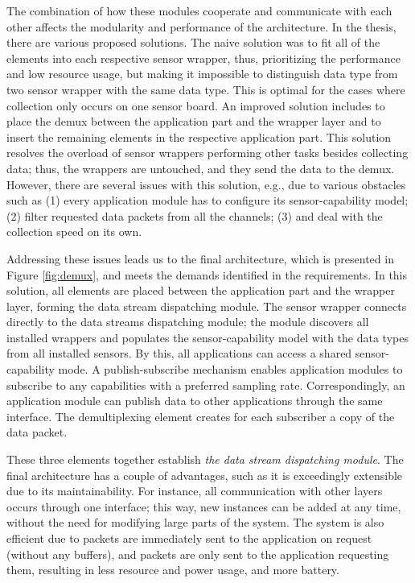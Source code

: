The combination of how these modules cooperate and communicate with each other affects the modularity and performance of the architecture. In the thesis, there are various proposed solutions. The naive solution was to fit all of the elements into each respective sensor wrapper, thus, prioritizing the performance and low resource usage, but making it impossible to distinguish data type from two sensor wrapper with the same data type. This is optimal for the cases where collection only occurs on one sensor board. An improved solution includes to place the demux between the application part and the wrapper layer and to insert the remaining elements in the respective application part. This solution resolves the overload of sensor wrappers performing other tasks besides collecting data; thus, the wrappers are untouched, and they send the data to the demux. However, there are several issues with this solution, e.g., due to various obstacles such as (1) every application module has to configure its sensor-capability model; (2) filter requested data packets from all the channels; (3) and deal with the collection speed on its own.

Addressing these issues leads us to the final architecture, which is presented in Figure \ref{fig:demux}, and meets the demands identified in the requirements. In this solution, all elements are placed between the application part and the wrapper layer, forming the data stream dispatching module. The sensor wrapper connects directly to the data streams dispatching module; the module discovers all installed wrappers and populates the sensor-capability model with the data types from all installed sensors. By this, all applications can access a shared sensor-capability mode. A publish-subscribe mechanism enables application modules to subscribe to any capabilities with a preferred sampling rate. Correspondingly, an application module can publish data to other applications through the same interface. The demultiplexing element creates for each subscriber a copy of the data packet. 

These three elements together establish \textit{the data stream dispatching module}. The final architecture has a couple of advantages, such as it is exceedingly extensible due to its maintainability. For instance, all communication with other layers occurs through one interface; this way, new instances can be added at any time, without the need for modifying large parts of the system. The system is also efficient due to packets are immediately sent to the application on request (without any buffers), and packets are only sent to the application requesting them, resulting in less resource and power usage, and more battery.

